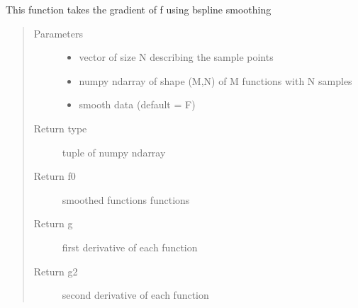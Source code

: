 \documentclass[letterpaper,10pt,english]{sphinxmanual}
\begin{document}
\begin{fulllineitems}
\label{\detokenize{utility_functions:utility_functions.gradient_spline}}
This function takes the gradient of f using b\sphinxhyphen{}spline smoothing
\begin{quote}\begin{description}
\item[{Parameters}] \leavevmode\begin{itemize}
\item {} 
 \textendash{} vector of size N describing the sample points

\item {} 
 \textendash{} numpy ndarray of shape (M,N) of M functions with N samples

\item {} 
 \textendash{} smooth data (default = F)

\end{itemize}

\item[{Return type}] \leavevmode
tuple of numpy ndarray

\item[{Return f0}] \leavevmode
smoothed functions functions

\item[{Return g}] \leavevmode
first derivative of each function

\item[{Return g2}] \leavevmode
second derivative of each function

\end{description}\end{quote}

\end{fulllineitems}

\end{document}
